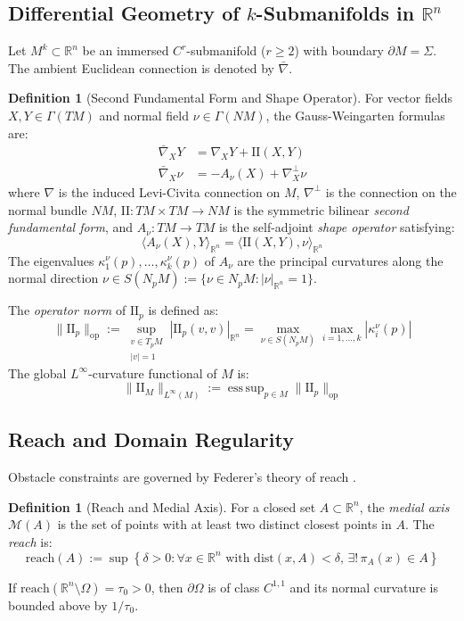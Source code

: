 \documentclass[11pt,reqno]{amsart}
\theoremstyle{definition}
\newtheorem{definition}[theorem]{Definition}
\providecommand{\R}{\mathbb{R}}
\providecommand{\II}{\mathrm{I\!I}}
\newcommand{\op}{\mathrm{op}}
\newcommand{\dist}{\mathrm{dist}}
\newcommand{\reach}{\mathrm{reach}}
\newcommand{\medial}{\mathcal{M}}
\numberwithin{equation}{section}
\providecommand{\II}{\mathrm{II}}
\providecommand{\R}{\mathbb{R}}
\begin{document}
\subsection{Differential Geometry of \texorpdfstring{$k$}{k}-Submanifolds in \texorpdfstring{$\R^n$}{R\textasciicircum n}}
Let $M^k \subset \R^n$ be an immersed $C^r$-submanifold ($r \ge 2$) with boundary $\partial M = \Sigma$. The ambient Euclidean connection is denoted by $\bar{\nabla}$.

\begin{definition}[Second Fundamental Form and Shape Operator]
For vector fields $X, Y \in \Gamma(TM)$ and normal field $\nu \in \Gamma(NM)$, the Gauss-Weingarten formulas are:
\begin{align}
\bar{\nabla}_X Y &= \nabla_X Y + \II(X, Y) \\
\bar{\nabla}_X \nu &= -A_\nu(X) + \nabla^\perp_X \nu
\end{align}
where $\nabla$ is the induced Levi-Civita connection on $M$, $\nabla^\perp$ is the connection on the normal bundle $NM$, $\II: TM \times TM \to NM$ is the symmetric bilinear \emph{second fundamental form}, and $A_\nu: TM \to TM$ is the self-adjoint \emph{shape operator} satisfying:
\begin{equation}
\langle A_\nu(X), Y \rangle_{\R^n} = \langle \II(X, Y), \nu \rangle_{\R^n}
\end{equation}
The eigenvalues $\kappa_1^\nu(p), \dots, \kappa_k^\nu(p)$ of $A_\nu$ are the principal curvatures along the normal direction $\nu \in S(N_pM) := \{\nu \in N_pM : |\nu|_{\R^n} = 1\}$.

The \emph{operator norm} of $\II_p$ is defined as:
\begin{equation}
\|\II_p\|_{\op} := \sup_{\substack{v \in T_pM \\ |v|=1}} |\II_p(v,v)|_{\R^n} = \max_{\nu \in S(N_pM)} \max_{i=1,\dots,k} |\kappa_i^\nu(p)|
\end{equation}
The global $L^\infty$-curvature functional of $M$ is:
\begin{equation}
\|\II_M\|_{L^\infty(M)} := \operatorname{ess\,sup}_{p \in M} \|\II_p\|_{\op}
\end{equation}
\end{definition}

\subsection{Reach and Domain Regularity}
Obstacle constraints are governed by Federer's theory of reach \cite{federer1959}.
\begin{definition}[Reach and Medial Axis]
For a closed set $A \subset \R^n$, the \emph{medial axis} $\medial(A)$ is the set of points with at least two distinct closest points in $A$. The \emph{reach} is:
\begin{equation}
\reach(A) := \sup \left\{ \delta > 0 : \forall x \in \R^n \text{ with } \dist(x, A) < \delta, \, \exists ! \, \pi_A(x) \in A \right\}
\end{equation}
\end{definition}
If $\reach(\R^n \setminus \Omega) = \tau_0 > 0$, then $\partial\Omega$ is of class $C^{1,1}$ and its normal curvature is bounded above by $1/\tau_0$.
\end{document}
